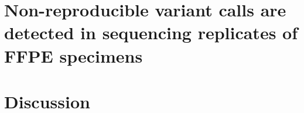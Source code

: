\section{Non-reproducible variant calls are detected in sequencing replicates of FFPE specimens}
\label{sec:}

\section{Discussion}
\label{sec:Discussion}
